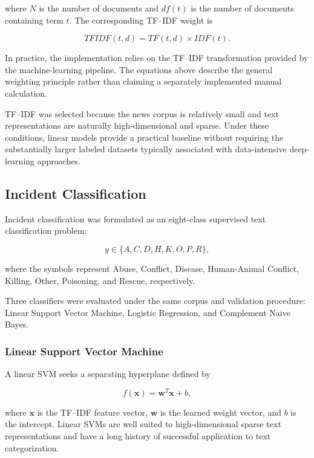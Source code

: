 \documentclass[conference]{IEEEtran}
\begin{document}
where $N$ is the number of documents and $df(t)$ is the number of documents
containing term $t$. The corresponding TF--IDF weight is

\begin{equation}
TFIDF(t,d)=TF(t,d)\times IDF(t).
\end{equation}

In practice, the implementation relies on the TF--IDF transformation provided
by the machine-learning pipeline. The equations above describe the general
weighting principle rather than claiming a separately implemented manual
calculation.

TF--IDF was selected because the news corpus is relatively small and text
representations are naturally high-dimensional and sparse. Under these
conditions, linear models provide a practical baseline without requiring the
substantially larger labeled datasets typically associated with
data-intensive deep-learning approaches.

\subsection{Incident Classification}

Incident classification was formulated as an eight-class supervised text
classification problem:

\begin{equation}
y \in
\{
A,C,D,H,K,O,P,R
\},
\end{equation}

where the symbols represent Abuse, Conflict, Disease, Human-Animal Conflict,
Killing, Other, Poisoning, and Rescue, respectively.

Three classifiers were evaluated under the same corpus and validation
procedure: Linear Support Vector Machine, Logistic Regression, and Complement
Naive Bayes.

\subsubsection{Linear Support Vector Machine}

A linear SVM seeks a separating hyperplane defined by

\begin{equation}
f(\mathbf{x})=\mathbf{w}^{T}\mathbf{x}+b,
\end{equation}

where $\mathbf{x}$ is the TF--IDF feature vector, $\mathbf{w}$ is the learned
weight vector, and $b$ is the intercept. Linear SVMs are well suited to
high-dimensional sparse text representations and have a long history of
successful application to text categorization.
\end{document}
